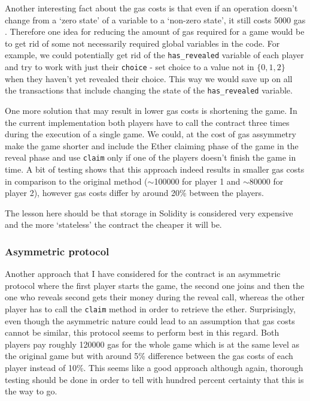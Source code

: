 \documentclass{article}
\begin{document}
    \noindent Another interesting fact about the gas costs
    is that even if an operation doesn't change from a `zero
    state' of a variable to a `non-zero state', it still
    costs 5000 gas \cite{ypaper}. Therefore one idea for
    reducing the amount of gas required for a game would be
    to get rid of some not necessarily required global
    variables in the code. For example, we could potentially
    get rid of the \verb|has_revealed| variable of each
    player and try to work with just their \verb|choice| -
    set choice to a value not in \(\{0,1,2\}\) when they
    haven't yet revealed their choice. This way we would
    save up on all the transactions that include changing
    the state of the \verb|has_revealed| variable.
    \newline

    \noindent One more solution that may result in lower gas
    costs is shortening the game. In the current
    implementation both players have to call the contract
    three times during the execution of a single game. We
    could, at the cost of gas assymmetry make the game
    shorter and include the Ether claiming phase of the game
    in the reveal phase and use \verb|claim| only if one of
    the players doesn't finish the game in time. A bit of
    testing shows that this approach indeed results in
    smaller gas costs in comparison to the original method
    (\(\sim\)100000 for player 1 and \(\sim\)80000 for
    player 2), however gas costs differ by around 20\%
    between the players.
    \newline

    \noindent The lesson here should be that storage in
    Solidity is considered very expensive and the more
    `stateless' the contract the cheaper it will be.

    \subsubsection{Asymmetric protocol}
    Another approach that I have considered for the contract
    is an asymmetric protocol where the first player starts
    the game, the second one joins and then the one who
    reveals second gets their money during the reveal call,
    whereas the other player has to call the \verb|claim|
    method in order to retrieve the ether. Surprisingly,
    even though the asymmetric nature could lead to an
    assumption that gas costs cannot be similar, this
    protocol seems to perform best in this regard. Both
    players pay roughly 120000 gas for the whole game which
    is at the same level as the original game but with
    around 5\% difference between the gas costs of each
    player instead of 10\%. This seems like a good approach
    although again, thorough testing should be done in order
    to tell with hundred percent certainty that this is the
    way to go.
\end{document}
